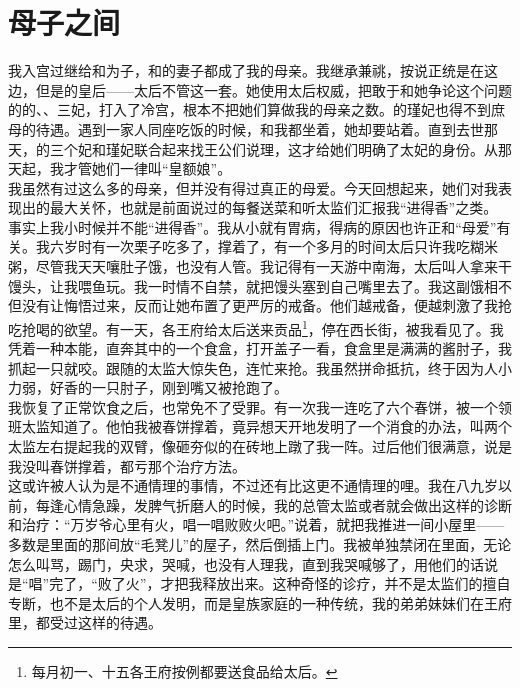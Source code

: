 \fancyhead[RO]{} %
\fancyhead[LE]{} %
\chapter*{母子之间}
\thispagestyle{empty}
我入宫过继给和为子，和的妻子都成了我的母亲。我继承兼祧，按说正统是在这边，但是的皇后——太后不管这一套。她使用太后权威，把敢于和她争论这个问题的的、、三妃，打入了冷宫，根本不把她们算做我的母亲之数。的瑾妃也得不到庶母的待遇。遇到一家人同座吃饭的时候，和我都坐着，她却要站着。直到去世那天，的三个妃和瑾妃联合起来找王公们说理，这才给她们明确了太妃的身份。从那天起，我才管她们一律叫“皇额娘”。\\

我虽然有过这么多的母亲，但并没有得过真正的母爱。今天回想起来，她们对我表现出的最大关怀，也就是前面说过的每餐送菜和听太监们汇报我“进得香”之类。\\

事实上我小时候并不能“进得香”。我从小就有胃病，得病的原因也许正和“母爱”有关。我六岁时有一次栗子吃多了，撑着了，有一个多月的时间太后只许我吃糊米粥，尽管我天天嚷肚子饿，也没有人管。我记得有一天游中南海，太后叫人拿来干馒头，让我喂鱼玩。我一时情不自禁，就把馒头塞到自己嘴里去了。我这副饿相不但没有让悔悟过来，反而让她布置了更严厉的戒备。他们越戒备，便越刺激了我抢吃抢喝的欲望。有一天，各王府给太后送来贡品\footnote{每月初一、十五各王府按例都要送食品给太后。}，停在西长街，被我看见了。我凭着一种本能，直奔其中的一个食盒，打开盖子一看，食盒里是满满的酱肘子，我抓起一只就咬。跟随的太监大惊失色，连忙来抢。我虽然拼命抵抗，终于因为人小力弱，好香的一只肘子，刚到嘴又被抢跑了。\\

我恢复了正常饮食之后，也常免不了受罪。有一次我一连吃了六个春饼，被一个领班太监知道了。他怕我被春饼撑着，竟异想天开地发明了一个消食的办法，叫两个太监左右提起我的双臂，像砸夯似的在砖地上蹾了我一阵。过后他们很满意，说是我没叫春饼撑着，都亏那个治疗方法。\\

这或许被人认为是不通情理的事情，不过还有比这更不通情理的哩。我在八九岁以前，每逢心情急躁，发脾气折磨人的时候，我的总管太监或者就会做出这样的诊断和治疗：“万岁爷心里有火，唱一唱败败火吧。”说着，就把我推进一间小屋里——多数是里面的那间放“毛凳儿”的屋子，然后倒插上门。我被单独禁闭在里面，无论怎么叫骂，踢门，央求，哭喊，也没有人理我，直到我哭喊够了，用他们的话说是“唱”完了，“败了火”，才把我释放出来。这种奇怪的诊疗，并不是太监们的擅自专断，也不是太后的个人发明，而是皇族家庭的一种传统，我的弟弟妹妹们在王府里，都受过这样的待遇。\\

